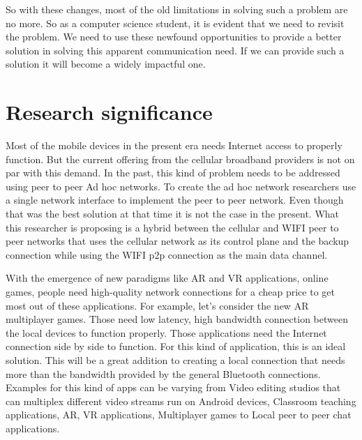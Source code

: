 \vspace{12pt}


So with these changes, most of the old limitations in solving such a problem are no more. So as a computer science student, it is evident that we need to revisit the problem. We need to use these newfound opportunities to provide a better solution in solving this apparent communication need. If we can provide such a solution it will become a widely impactful one. 

\vspace{12pt}
\clearpage



\section{Research significance}
\vspace{12pt}
Most of the mobile devices in the present era needs Internet access to properly function. But the current offering from the cellular broadband providers is not on par with this demand. In the past, this kind of problem needs to be addressed using peer to peer Ad hoc networks. To create the ad hoc network researchers use a single network interface to implement the peer to peer network. Even though that was the best solution at that time it is not the case in the present. What this researcher is proposing is a hybrid between the cellular and  WIFI  peer to peer networks that uses the cellular network as its control plane and the backup connection while using the  WIFI  p2p connection as the main data channel.

\vspace{12pt}
With the emergence of new paradigms like AR and VR applications, online games, people need high-quality network connections for a cheap price to get most out of these applications. For example, let’s consider the new AR multiplayer games. Those need low latency, high bandwidth connection between the local devices to function properly. Those applications need the Internet connection side by side to function. For this kind of application, this is an ideal solution. This will be a great addition to creating a local connection that needs more than the bandwidth provided by the general Bluetooth connections. Examples for this kind of apps can be varying from Video editing studios that can multiplex different video streams run on Android devices, Classroom teaching applications, AR, VR applications, Multiplayer games to Local peer to peer chat applications.

